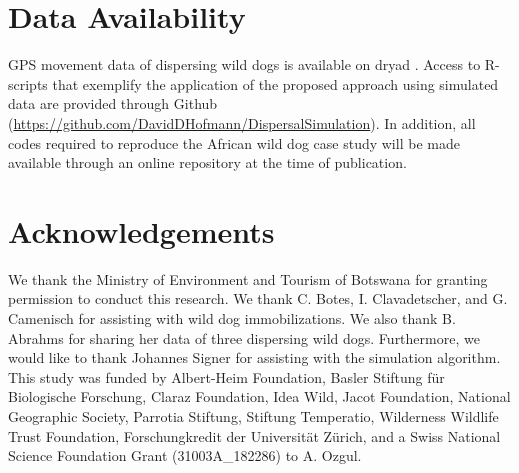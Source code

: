 \documentclass[abstract=on,10pt,a4paper,bibliography=totocnumbered]{article}
\begin{document}
\section{Data Availability}
GPS movement data of dispersing wild dogs is available on dryad
\citep{Hofmann.2021b}. Access to R-scripts that exemplify the application of the
proposed approach using simulated data are provided through Github
(\url{https://github.com/DavidDHofmann/DispersalSimulation}). In addition, all
codes required to reproduce the African wild dog case study will be made
available through an online repository at the time of publication.

\section{Acknowledgements}
We thank the Ministry of Environment and Tourism of Botswana for granting
permission to conduct this research. We thank C. Botes, I. Clavadetscher, and G.
Camenisch for assisting with wild dog immobilizations. We also thank B. Abrahms
for sharing her data of three dispersing wild dogs. Furthermore, we would like
to thank Johannes Signer for assisting with the simulation algorithm. This study
was funded by Albert-Heim Foundation, Basler Stiftung für Biologische Forschung,
Claraz Foundation, Idea Wild, Jacot Foundation, National Geographic Society,
Parrotia Stiftung, Stiftung Temperatio, Wilderness Wildlife Trust Foundation,
Forschungkredit der Universität Zürich, and a Swiss National Science Foundation
Grant (31003A\_182286) to A. Ozgul.

\newpage
\begingroup
\singlespacing

\endgroup
\end{document}
